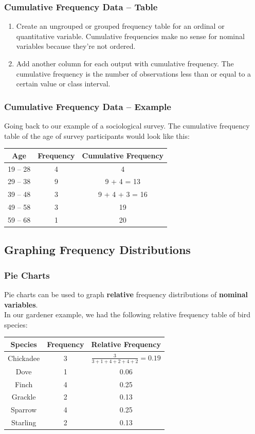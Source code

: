 \documentclass[aspectratio=169,11pt,svgnames]{beamer}
\begin{document}
\begin{frame}
 \frametitle{Cumulative Frequency Data -- Table}
 \begin{enumerate}
  \item Create an ungrouped or grouped frequency table for \alert{an ordinal or
   quantitative variable}. Cumulative frequencies make no sense for nominal
   variables because they're not ordered.
  \pause
  \item Add another column for each output with \alert{cumulative frequency}.
   The cumulative frequency is the number of observations less than or equal to
   a certain value or class interval.
 \end{enumerate}
\end{frame}

\begin{frame}
 \frametitle{Cumulative Frequency Data -- Example}
 Going back to our example of a sociological survey. The cumulative frequency
 table of the age of survey participants would look like this:
 \begin{center}
  \begin{tabular}{c|c|c}
   \textbf{Age} & \textbf{Frequency} & \textbf{Cumulative Frequency}\\
   \toprule
   19 -- 28 & 4 & 4 \\
   29 -- 38 & 9 & 9 + 4 = 13 \\
   39 -- 48 & 3 & 9 + 4 + 3 = 16 \\
   49 -- 58 & 3 & 19 \\
   59 -- 68 & 1 & 20
  \end{tabular}
 \end{center}
\end{frame}

\subsection{Graphing Frequency Distributions}

\begin{frame}
 \subsectionpage
\end{frame}

\begin{frame}
 \frametitle{Pie Charts}
 Pie charts can be used to graph \textbf{relative} frequency distributions of
 \textbf{nominal variables}.\\
 \pause
 In our gardener example, we had the following relative frequency table of bird
 species:
 \begin{center}
  \begin{tabular}{c|c|c}
   \textbf{Species} & \textbf{Frequency} & \textbf{Relative Frequency}\\
   \toprule
   Chickadee & 3 & $\frac{3}{3 + 1 + 4 + 2 + 4 + 2} = 0.19$\\
   Dove & 1 & 0.06\\
   Finch & 4 & 0.25\\
   Grackle & 2 & 0.13\\
   Sparrow & 4 & 0.25\\
   Starling & 2 & 0.13
  \end{tabular}
 \end{center}
\end{frame}
\end{document}
